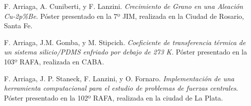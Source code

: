  F. Arriaga, A. Cuniberti, y F. Lanzini. \textit{Crecimiento de Grano en una Aleación Cu-2p\%Be}. Póster presentado en la 7º JIM, realizada en la Ciudad de Rosario, Santa Fe.

 F. Arriaga, J.M. Gomba, y M. Stipcich. \textit{Coeficiente de transferencia térmica de un sistema silicio/PDMS enfriado por debajo de 273 K}. Póster presentado en la 103º RAFA, realizada en CABA.

 F. Arriaga, J. P. Staneck, F. Lanzini, y O. Fornaro. \textit{Implementación de una herramienta computacional para el estudio de problemas de fuerzas centrales}. Póster presentado en la 102º RAFA, realizada en la ciudad de La Plata.